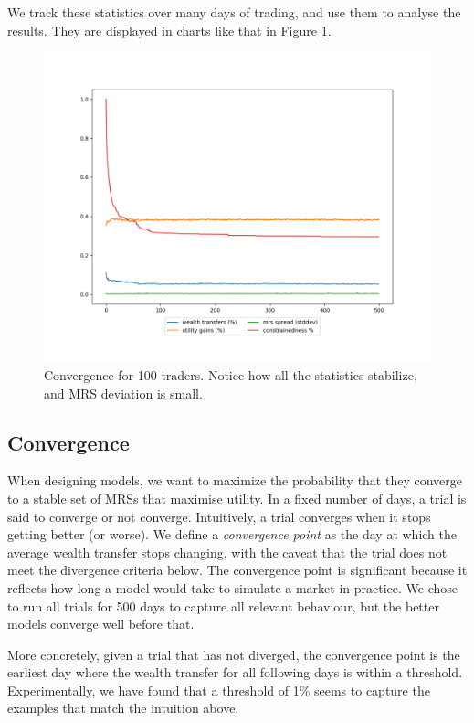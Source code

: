 \documentclass[12pt,a4paper,titlepage]{article}
\begin{document}
We track these statistics over many days of trading, and use them to analyse the results.
They are displayed in charts like that in Figure \ref{fig:conv}.

\begin{figure}[H]
    \centering
    \includegraphics[width=\textwidth]{seed_5.png}
    \caption{
      Convergence for 100 traders.
      Notice how all the statistics stabilize, and MRS deviation is small.
    }
    \label{fig:conv}
\end{figure}

\subsection{Convergence}
When designing models, we want to maximize the probability that they converge to a stable set of MRSs that maximise utility.
In a fixed number of days, a trial is said to converge or not converge.
Intuitively, a trial converges when it stops getting better (or worse).
We define a \textit{convergence point} as the day at which the average wealth transfer stops changing, with the caveat that the trial does not meet the divergence criteria below.
The convergence point is significant because it reflects how long a model would take to simulate a market in practice.
We chose to run all trials for 500 days to capture all relevant behaviour, but the better models converge well before that.

More concretely, given a trial that has not diverged, the convergence point is the earliest day where the wealth transfer for all following days is within a threshold.
Experimentally, we have found that a threshold of 1\% seems to capture the examples that match the intuition above.
\end{document}

